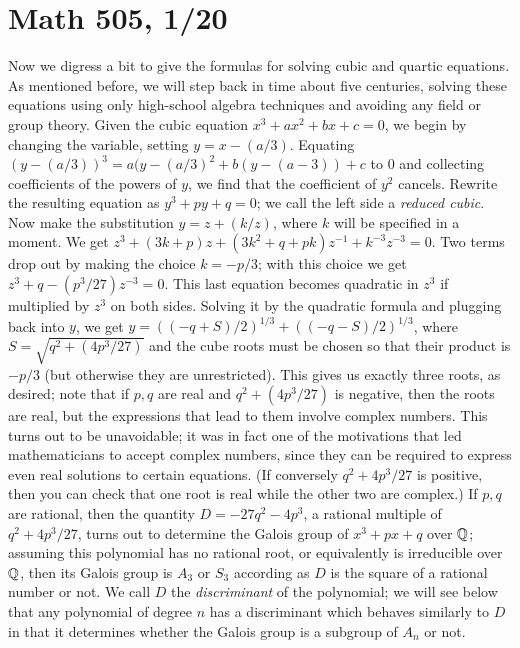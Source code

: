 \documentclass[10pt]{article}
\begin{document}
\section*{Math 505, 1/20}

Now we digress a bit to give the formulas for solving cubic and quartic
equations. As mentioned before, we will step back in time about five
centuries, solving these equations using only high-school algebra
techniques and avoiding any field or group theory. Given the cubic
equation $x^3 + ax^2 + bx + c = 0$, we begin by changing the variable,
setting $y = x - (a/3)$. Equating $(y- (a/3))^3 = a(y - (a/3)^2 + b(y -
(a-3)) + c$ to 0 and collecting coefficients of the powers of $y$, we
find that the coefficient of $y^2$ cancels. Rewrite the resulting
equation as $y^3 + py + q = 0$; we call the left side a {\sl reduced
  cubic}. Now make the substitution $y = z + (k/z)$, where $k$ will be
specified in a moment. We get $z^3 + (3k + p)z + (3k^2 + q + pk)z^{-1} +
k^{-3}z^{-3} = 0$. Two terms drop out by making the choice $k = -p/3$;
with this choice we get $z^3 + q - (p^3/27)z^{-3} = 0$. This last
equation becomes quadratic in $z^3$ if multiplied by $z^3$ on both
sides. Solving it by the quadratic formula and plugging back into $y$,
we get $y = ((-q + S)/2)^{1/3} + ((-q - S)/2)^{1/3}$, where $S =
\sqrt{q^2 + (4p^3/27)}$ and the cube roots must be chosen so that their
product is $-p/3$ (but otherwise they are unrestricted). This gives us
exactly three roots, as desired; note that if $p,q$ are real and $q^2 +
(4p^3/27)$ is negative, then the roots are real, but the expressions
that lead to them involve complex numbers. This turns out to be
unavoidable; it was in fact one of the motivations that led
mathematicians to accept complex numbers, since they can be required to
express even real solutions to certain equations. (If conversely $q^2 +
4p^3/27$ is positive, then you can check that one root is real while the
other two are complex.) If $p,q$ are rational, then the quantity
$D=-27q^2 - 4p^3$, a rational multiple of $q^2 + 4p^3/27$, turns out to
determine the Galois group of $x^3 + px + q$ over $\Bbb Q$; assuming
this polynomial has no rational root, or equivalently is irreducible
over $\Bbb Q$, then its Galois group is $A_3$ or $S_3$ according as $D$
is the square of a rational number or not. We call $D$ the {\sl
  discriminant} of the polynomial; we will see below that any polynomial
of degree $n$ has a discriminant which behaves similarly to $D$ in that
it determines whether the Galois group is a subgroup of $A_n$ or not.
\end{document}
